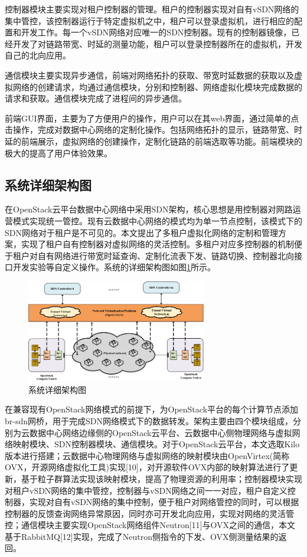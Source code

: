 控制器模块主要实现对租户控制器的管理。租户的控制器实现对自有vSDN网络的集中管控，该控制器运行于特定虚拟机之中，租户可以登录虚拟机，进行相应的配置和开发工作。每一个vSDN网络对应唯一的SDN控制器。现有的控制器镜像，已经开发了对链路带宽、时延的测量功能，租户可以登录控制器所在的虚拟机，开发自己的北向应用。

通信模块主要实现异步通信，前端对网络拓扑的获取、带宽时延数据的获取以及虚拟网络的创建请求，均通过通信模块，分别和控制器、网络虚拟化模块完成数据的请求和获取。通信模块完成了进程间的异步通信。

前端GUI界面，主要为了方便用户的操作，用户可以在其web界面，通过简单的点击操作，完成对数据中心网络的定制化操作。包括网络拓扑的显示，链路带宽、时延的前端展示，虚拟网络的创建操作，定制化链路的前端选取等功能。前端模块的极大的提高了用户体验效果。

\subsection{系统详细架构图}
在OpenStack云平台数据中心网络中采用SDN架构，核心思想是用控制器对网路运营模式实现统一管控。现有云数据中心网络的模式均为单一节点控制，该模式下的SDN网络对于租户是不可见的。本文提出了多租户虚拟化网络的定制和管理方案，实现了租户自有控制器对虚拟网络的灵活控制。多租户对应多控制器的机制便于租户对自有网络进行带宽时延查询、定制化流表下发、链路切换、控制器北向接口开发实验等自定义操作。系统的详细架构图如图\ref{fig:architecture}所示。

\begin{figure}[!htb]
  \centering
  \includegraphics[width=0.7\textwidth]{logo/architecture.png}
  \caption{系统详细架构图}
  \label{fig:architecture}
\end{figure}

在兼容现有OpenStack网络模式的前提下，为OpenStack平台的每个计算节点添加br-sdn网桥，用于完成SDN网络模式下的数据转发。架构主要由四个模块组成，分别为云数据中心网络边缘侧的OpenStack云平台、云数据中心侧物理网络与虚拟网络映射模块、SDN控制器模块、通信模块。对于OpenStack云平台，本文选取Kilo版本进行搭建；云数据中心物理网络与虚拟网络的映射模块由OpenVirtex(简称OVX，开源网络虚拟化工具)实现[10]，对开源软件OVX内部的映射算法进行了更新，基于粒子群算法实现该映射模块，提高了物理资源的利用率；控制器模块实现对租户vSDN网络的集中管控，控制器与vSDN网络之间一一对应，租户自定义控制器，实现对自有vSDN网络的集中控制，便于租户对网络管控的同时，可以根据控制器的反馈查询网络异常原因，同时亦可开发北向应用，实现对网络的灵活管控；通信模块主要实现OpenStack网络组件Neutron[11]与OVX之间的通信，本文基于RabbitMQ[12]实现，完成了Neutron侧指令的下发、OVX侧测量结果的返回。
